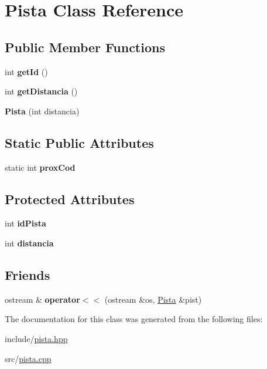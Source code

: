 \hypertarget{classPista}{}\section{Pista Class Reference}
\label{classPista}
\subsection*{Public Member Functions}
\begin{DoxyCompactItemize}
\item 
\mbox{\label{classPista_ac3e4ec4a2cc6a70a48244a4875fd7633}} 
int {\bfseries get\+Id} ()
\item 
\mbox{\label{classPista_ac0600ef25b5e73b5b21e465dbd8f02e2}} 
int {\bfseries get\+Distancia} ()
\item 
\mbox{\label{classPista_a877fc3a9bc0ffb028324d358d71b5d62}} 
{\bfseries Pista} (int distancia)
\end{DoxyCompactItemize}
\subsection*{Static Public Attributes}
\begin{DoxyCompactItemize}
\item 
\mbox{\label{classPista_afbdfc5a177c19e90bcf540ae4b5e7528}} 
static int {\bfseries prox\+Cod}
\end{DoxyCompactItemize}
\subsection*{Protected Attributes}
\begin{DoxyCompactItemize}
\item 
\mbox{\label{classPista_a9f47f82ba6a69f1cc088e0483649164e}} 
int {\bfseries id\+Pista}
\item 
\mbox{\label{classPista_a3c8a346470e8660b4a91a2eb6730e2c6}} 
int {\bfseries distancia}
\end{DoxyCompactItemize}
\subsection*{Friends}
\begin{DoxyCompactItemize}
\item 
\mbox{\label{classPista_a0e16c20ff43094a1e1c426a6bc377313}} 
ostream \& {\bfseries operator$<$$<$} (ostream \&os, \hyperlink{classPista}{Pista} \&pist)
\end{DoxyCompactItemize}


The documentation for this class was generated from the following files\+:\begin{DoxyCompactItemize}
\item 
include/\hyperlink{pista_8hpp}{pista.\+hpp}\item 
src/\hyperlink{pista_8cpp}{pista.\+cpp}\end{DoxyCompactItemize}
